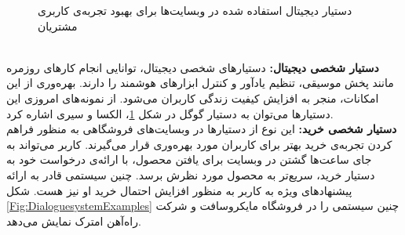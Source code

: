 \begin{figure}[!htb]
	\caption{
		دستیار دیجیتال استفاده شده در وبسایت‌ها برای بهبود تجربه‌ی کاربری مشتریان
	}
	\label{Fig:DialoguesystemExamples۲}
\end{figure}
\\
\textbf { دستیار شخصی دیجیتال:}
دستیارهای شخصی دیجیتال، توانایی انجام کارهای روزمره مانند پخش موسیقی، تنظیم یادآور و کنترل ابزارهای هوشمند را دارند. بهره‌وری از این امکانات، منجر به افزایش کیفیت زندگی کاربران می‌شود. از نمونه‌های امروزی این دستیارها می‌توان به دستیار گوگل در شکل \ref{Fig:DialoguesystemExamples۲}، الکسا و سیری اشاره کرد.
\\
\textbf { دستیار شخصی خرید:}
این نوع از دستیارها در وبسایت‌های فروشگاهی به منظور فراهم کردن تجربه‌ی خرید بهتر برای کاربران مورد بهره‌وری قرار می‌گیرند. کاربر می‌تواند به جای ساعت‌ها گشتن در وبسایت برای یافتن محصول، با ارائه‌ی درخواست خود به دستیار خرید، سریع‌تر به محصول مورد نظرش برسد. چنین سیستمی قادر به ارائه پیشنهادهای ویژه به کاربر به منظور افزایش احتمال خرید او نیز هست. شکل \ref{Fig:DialoguesystemExamples} چنین سیستمی را در فروشگاه مایکروسافت و شرکت راه‌آهن امترک نمایش می‌دهد.
